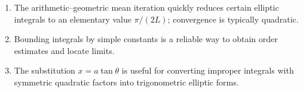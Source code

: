 \begin{takeaways}
\begin{enumerate}
  \item The arithmetic--geometric mean iteration quickly reduces certain elliptic integrals to an elementary value $\pi/(2L)$; convergence is typically quadratic.
  \item Bounding integrals by simple constants is a reliable way to obtain order estimates and locate limits.
  \item The substitution $x=a\tan\theta$ is useful for converting improper integrals with symmetric quadratic factors into trigonometric elliptic forms.
\end{enumerate}
\end{takeaways}
